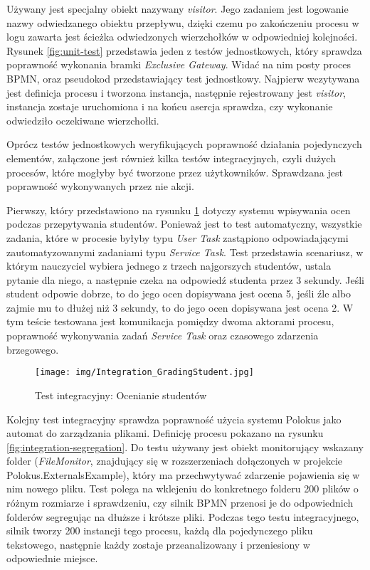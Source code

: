 \documentclass[declaration,shortabstract,mgr]{iithesis}
\newcommand{\bpmn}{BPMN }
\newcommand{\bpmnnospace}{BPMN}
\begin{document}
Używany jest specjalny obiekt nazywany \textit{visitor}. Jego zadaniem jest logowanie nazwy odwiedzanego obiektu przepływu, dzięki czemu po zakończeniu procesu w logu zawarta jest ścieżka odwiedzonych wierzchołków w odpowiedniej kolejności. Rysunek \ref{fig:unit-test} przedstawia jeden z testów jednostkowych, który sprawdza poprawność wykonania bramki \textit{Exclusive Gateway}. Widać na nim posty proces \bpmnnospace, oraz pseudokod przedstawiający test jednostkowy. Najpierw wczytywana jest definicja procesu i tworzona instancja, następnie rejestrowany jest \textit{visitor}, instancja zostaje uruchomiona i na końcu asercja sprawdza, czy wykonanie odwiedziło oczekiwane wierzchołki.


Oprócz testów jednostkowych weryfikujących poprawność działania pojedynczych elementów, załączone jest również kilka testów integracyjnych, czyli dużych procesów, które mogłyby być tworzone przez użytkowników. Sprawdzana jest poprawność wykonywanych przez nie akcji.

Pierwszy, który przedstawiono na rysunku \ref{fig:integration-grading} dotyczy systemu wpisywania ocen podczas przepytywania studentów. Ponieważ jest to test automatyczny, wszystkie zadania, które w procesie byłyby typu \textit{User Task} zastąpiono odpowiadającymi zautomatyzowanymi zadaniami typu \textit{Service Task}. Test przedstawia scenariusz, w którym nauczyciel wybiera jednego z trzech najgorszych studentów, ustala pytanie dla niego, a następnie czeka na odpowiedź studenta przez 3 sekundy. Jeśli student odpowie dobrze, to do jego ocen dopisywana jest ocena 5, jeśli źle albo zajmie mu to dłużej niż 3 sekundy, to do jego ocen dopisywana jest ocena 2. W tym teście testowana jest komunikacja pomiędzy dwoma aktorami procesu, poprawność wykonywania zadań \textit{Service Task} oraz czasowego zdarzenia brzegowego.

\begin{figure}[h]
     \centering
     \texttt{[image: img/Integration\_GradingStudent.jpg]}
     \caption{Test integracyjny: Ocenianie studentów}
     \label{fig:integration-grading}
\end{figure}

Kolejny test integracyjny sprawdza poprawność użycia systemu Polokus jako automat do zarządzania plikami. Definicję procesu pokazano na rysunku \ref{fig:integration-segregation}. Do testu używany jest obiekt monitorujący wskazany folder (\textit{FileMonitor}, znajdujący się w rozszerzeniach dołączonych w projekcie Polokus.ExternalsExample), który ma przechwytywać zdarzenie pojawienia się w nim nowego pliku. Test polega na wklejeniu do konkretnego folderu 200 plików o różnym rozmiarze i sprawdzeniu, czy silnik \bpmn przenosi je do odpowiednich folderów segregując na dłuższe i krótsze pliki. Podczas tego testu integracyjnego, silnik tworzy 200 instancji tego procesu, każdą dla pojedynczego pliku tekstowego, następnie każdy zostaje przeanalizowany i przeniesiony w odpowiednie miejsce.
\end{document}
